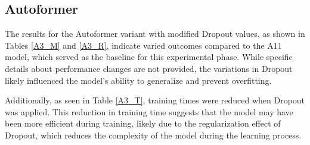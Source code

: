 \subsection{Autoformer}
The results for the Autoformer variant with modified Dropout values, as shown in Tables \ref{A3_M} and \ref{A3_R}, indicate varied outcomes compared to the A11 model, which served as the baseline for this experimental phase. While specific details about performance changes are not provided, the variations in Dropout likely influenced the model's ability to generalize and prevent overfitting.

Additionally, as seen in Table \ref{A3_T}, training times were reduced when Dropout was applied. This reduction in training time suggests that the model may have been more efficient during training, likely due to the regularization effect of Dropout, which reduces the complexity of the model during the learning process.


\begin{table}[]
    \centering
    \caption{Mean Squared Errors (MSE) for different Autoformer models obtained by varying the Dropout, sorted by model}
    \label{A3_M}
    \end{table}


